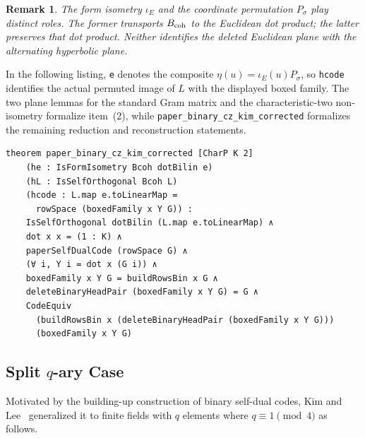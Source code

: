 \documentclass[12pt]{article}
\newtheorem{remark}[theorem]{Remark}
\begin{document}
\begin{remark}{\rm
The form isometry \(\iota_E\) and the coordinate permutation \(P_\sigma\)
play distinct roles.  The former transports \(B_{\rm coh}\) to the Euclidean
dot product; the latter preserves that dot product.  Neither identifies the
deleted Euclidean plane with the alternating hyperbolic plane.
}
\end{remark}

\noindent
In the following listing, \texttt{e} denotes the composite
\(\eta(u)=\iota_E(u)P_\sigma\), so \texttt{hcode} identifies the actual
permuted image of \(L\) with the displayed boxed family. The two plane
lemmas for the standard Gram matrix and the characteristic-two non-isometry
formalize item~(2), while
\texttt{paper\_binary\_cz\_kim\_corrected} formalizes the remaining
reduction and reconstruction statements.

\begin{lstlisting}[caption={Lean for Theorem~\ref{thm:binary-cz-kim}.}]
theorem paper_binary_cz_kim_corrected [CharP K 2]
    (he : IsFormIsometry Bcoh dotBilin e)
    (hL : IsSelfOrthogonal Bcoh L)
    (hcode : L.map e.toLinearMap =
      rowSpace (boxedFamily x Y G)) :
    IsSelfOrthogonal dotBilin (L.map e.toLinearMap) ∧
    dot x x = (1 : K) ∧
    paperSelfDualCode (rowSpace G) ∧
    (∀ i, Y i = dot x (G i)) ∧
    boxedFamily x Y G = buildRowsBin x G ∧
    deleteBinaryHeadPair (boxedFamily x Y G) = G ∧
    CodeEquiv
      (buildRowsBin x (deleteBinaryHeadPair (boxedFamily x Y G)))
      (boxedFamily x Y G)
\end{lstlisting}

\subsection{\texorpdfstring{\hspace{0.2em}Split \(q\)-ary Case}{Split q-ary Case}}

Motivated by the building-up construction of binary self-dual codes, Kim and Lee~\cite{KimLee} generalized it to finite fields with $q$ elements where $q \equiv 1 \pmod{4}$ as follows.
\end{document}
